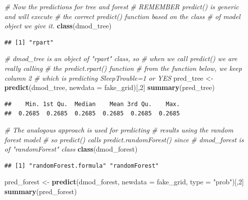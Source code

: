 \documentclass[]{article}
\newenvironment{Shaded}{\begin{snugshade}}{\end{snugshade}}
\newcommand{\KeywordTok}[1]{\textcolor[rgb]{0.13,0.29,0.53}{\textbf{{#1}}}}
\newcommand{\DataTypeTok}[1]{\textcolor[rgb]{0.13,0.29,0.53}{{#1}}}
\newcommand{\DecValTok}[1]{\textcolor[rgb]{0.00,0.00,0.81}{{#1}}}
\newcommand{\StringTok}[1]{\textcolor[rgb]{0.31,0.60,0.02}{{#1}}}
\newcommand{\CommentTok}[1]{\textcolor[rgb]{0.56,0.35,0.01}{\textit{{#1}}}}
\newcommand{\NormalTok}[1]{{#1}}
\begin{document}
\begin{Shaded}
\begin{Highlighting}[]
\CommentTok{# Now the predictions for tree and forest}
\CommentTok{# REMEMBER predict() is generic and will execute}
\CommentTok{# the correct predict() function based on the class}
\CommentTok{# of model object we give it.}
\KeywordTok{class}\NormalTok{(dmod_tree)}
\end{Highlighting}
\end{Shaded}

\begin{verbatim}
## [1] "rpart"
\end{verbatim}

\begin{Shaded}
\begin{Highlighting}[]
\CommentTok{# dmod_tree is an object of "rpart" class, so}
\CommentTok{# when we call predict() we are really calling}
\CommentTok{# the predict.rpart() function}
\CommentTok{# from the function below, we keep column 2}
\CommentTok{# which is predicting SleepTrouble=1 or YES}
\NormalTok{pred_tree <-}\StringTok{ }\KeywordTok{predict}\NormalTok{(dmod_tree, }\DataTypeTok{newdata =} \NormalTok{fake_grid)[,}\DecValTok{2}\NormalTok{]}
\KeywordTok{summary}\NormalTok{(pred_tree)}
\end{Highlighting}
\end{Shaded}

\begin{verbatim}
##    Min. 1st Qu.  Median    Mean 3rd Qu.    Max. 
##  0.2685  0.2685  0.2685  0.2685  0.2685  0.2685
\end{verbatim}

\begin{Shaded}
\begin{Highlighting}[]
\CommentTok{# The analogous approach is used for predicting}
\CommentTok{# results using the random forest model}
\CommentTok{# so predict() calls predict.randomForest() since}
\CommentTok{# dmod_forest is of "randomForest" class}
\KeywordTok{class}\NormalTok{(dmod_forest)}
\end{Highlighting}
\end{Shaded}

\begin{verbatim}
## [1] "randomForest.formula" "randomForest"
\end{verbatim}

\begin{Shaded}
\begin{Highlighting}[]
\NormalTok{pred_forest <-}\StringTok{ }\KeywordTok{predict}\NormalTok{(dmod_forest, }\DataTypeTok{newdata =} \NormalTok{fake_grid, }\DataTypeTok{type =} \StringTok{"prob"}\NormalTok{)[,}\DecValTok{2}\NormalTok{]}
\KeywordTok{summary}\NormalTok{(pred_forest)}
\end{Highlighting}
\end{Shaded}
\end{document}

